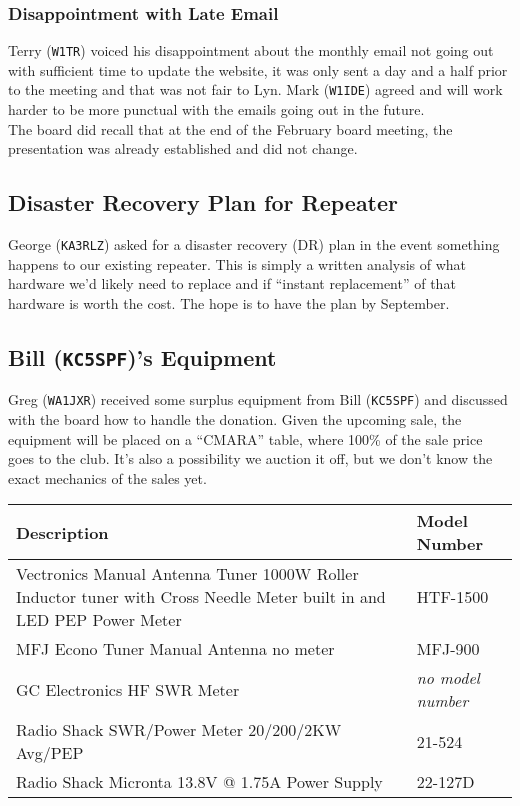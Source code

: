 \documentclass[10pt,letterpaper]{article}
\begin{document}
\subsubsection{Disappointment with Late Email}
Terry (\texttt{W1TR}) voiced his disappointment about the monthly email not going out with sufficient time to update the website, it was only sent a day and a half prior to the meeting and that was not fair to Lyn. Mark (\texttt{W1IDE}) agreed and will work harder to be more punctual with the emails going out in the future.\\

\noindent
The board did recall that at the end of the February board meeting, the presentation was already established and did not change.

\subsection{Disaster Recovery Plan for Repeater}
George (\texttt{KA3RLZ}) asked for a disaster recovery (DR) plan in the event something happens to our existing repeater. This is simply a written analysis of what hardware we'd likely need to replace and if ``instant replacement'' of that hardware is worth the cost. The hope is to have the plan by September.

\subsection{Bill (\texttt{KC5SPF})'s Equipment}
Greg (\texttt{WA1JXR}) received some surplus equipment from Bill (\texttt{KC5SPF}) and discussed with the board how to handle the donation. Given the upcoming sale, the equipment will be placed on a ``CMARA'' table, where 100\% of the sale price goes to the club. It's also a possibility we auction it off, but we don't know the exact mechanics of the sales yet.\\

\noindent
\begin{tabular}{|p{5in}|l|}
\hline
\textbf{Description} & \textbf{Model Number} \\ \hline
Vectronics Manual Antenna Tuner 1000W Roller Inductor tuner with Cross Needle Meter built in and LED PEP Power Meter & HTF-1500 \\ \hline
MFJ Econo Tuner Manual Antenna no meter & MFJ-900 \\ \hline
GC Electronics HF SWR Meter & \emph{no model number} \\ \hline
Radio Shack SWR/Power Meter 20/200/2KW Avg/PEP & 21-524 \\ \hline
Radio Shack Micronta 13.8V @ 1.75A Power Supply & 22-127D \\ \hline
\end{tabular}
\end{document}
